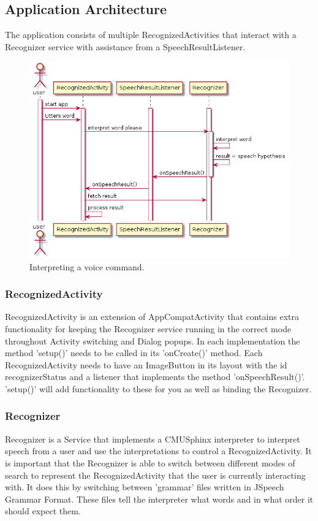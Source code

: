 \documentclass[11pt, oneside]{article}
\begin{document}
\subsection{Application Architecture}
The application consists of multiple RecognizedActivities that
interact with a Recognizer service with assistance from a
SpeechResultListener.

\begin{figure}[!h]
	\includegraphics[width=0.7\columnwidth]{speechsequence}
	\caption{Interpreting a voice command.}
\end{figure}

\subsubsection{RecognizedActivity}
RecognizedActivity is an extension of AppCompatActivity that contains
extra functionality for keeping the Recognizer service running in the
correct mode throughout Activity switching and Dialog popups. In each implementation the method 'setup()' needs to be called in its 'onCreate()' method. Each RecognizedActivity needs to have an ImageButton in its layout with the id recognizerStatus and a listener that implements the method 'onSpeechResult()'. 'setup()' will add functionality to these for you as well as binding the Recognizer.

\subsubsection{Recognizer}
Recognizer is a Service that implements a CMUSphinx interpreter to
interpret speech from a user and use the interpretations to control a
RecognizedActivity. It is important that the Recognizer is able to
switch between different modes of search to represent the
RecognizedActivity that the user is currently interacting with. It
does this by switching between 'grammar' files written in JSpeech
Grammar Format. These files tell the interpreter what words and in
what order it should expect them.
\end{document}
